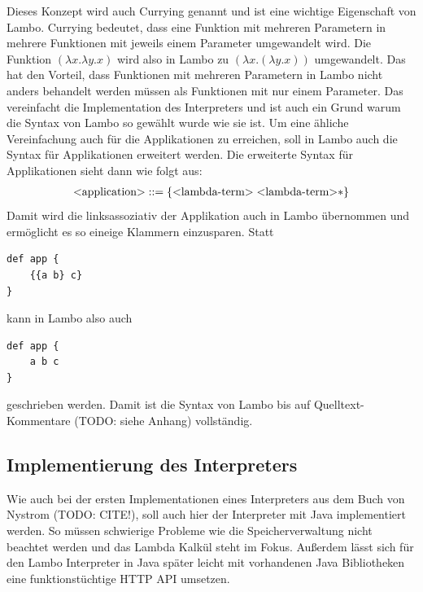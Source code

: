 \documentclass[ngerman]{article}
\begin{document}
Dieses Konzept wird auch Currying genannt und ist eine wichtige Eigenschaft von Lambo. Currying bedeutet, dass eine Funktion mit mehreren Parametern in mehrere Funktionen mit jeweils einem Parameter umgewandelt wird. Die Funktion $(\lambda x.\lambda y.x)$ wird also in Lambo zu $(\lambda x.(\lambda y.x))$ umgewandelt. Das hat den Vorteil, dass Funktionen mit mehreren Parametern in Lambo nicht anders behandelt werden müssen als Funktionen mit nur einem Parameter. Das vereinfacht die Implementation des Interpreters und ist auch ein Grund warum die Syntax von Lambo so gewählt wurde wie sie ist. Um eine ähliche Vereinfachung auch für die Applikationen zu erreichen, soll in Lambo auch die Syntax für Applikationen erweitert werden. Die erweiterte Syntax für Applikationen sieht dann wie folgt aus:
\begin{align*}
    \text{\textless application\textgreater} & ::= \{\text{\textless lambda-term\textgreater} \; \text{\textless lambda-term\textgreater}*\} \\
\end{align*}
Damit wird die linksassoziativ der Applikation auch in Lambo übernommen und ermöglicht es so eineige Klammern einzusparen. Statt
\begin{lstlisting}
def app {
    {{a b} c}
}
\end{lstlisting}
kann in Lambo also auch
\begin{lstlisting}
def app {
    a b c
}
\end{lstlisting}
geschrieben werden. Damit ist die Syntax von Lambo bis auf Quelltext-Kommentare (TODO: siehe Anhang) vollständig.

\subsection{Implementierung des Interpreters}

\captionsetup{labelformat=empty}
\lstset{
    language=Java,
    frame=single,
    breaklines=true,
    numbers=left,
    stepnumber=1,
    showstringspaces=false,
    tabsize=1,
    breaklines=true,
    breakatwhitespace=false,
    xleftmargin=.1\textwidth,
    xrightmargin=.1\textwidth
}

Wie auch bei der ersten Implementationen eines Interpreters aus dem Buch von Nystrom (TODO: CITE!), soll auch hier der Interpreter mit Java implementiert werden. So müssen schwierige Probleme wie die Speicherverwaltung nicht beachtet werden und das Lambda Kalkül steht im Fokus. Außerdem lässt sich für den Lambo Interpreter in Java später leicht mit vorhandenen Java Bibliotheken eine funktionstüchtige HTTP API umsetzen.
\end{document}
